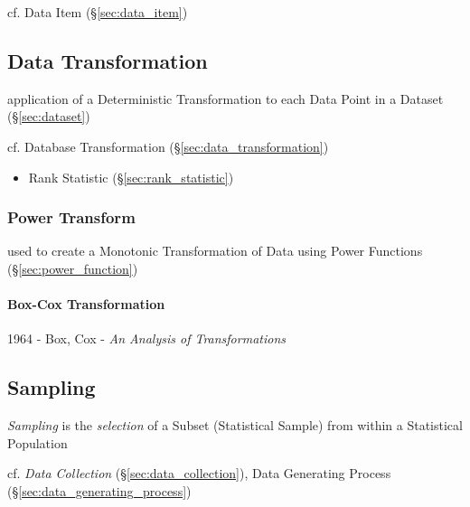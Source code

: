 cf. Data Item (\S\ref{sec:data_item})



\subsection{Data Transformation}\label{sec:dataset_transformation}

application of a Deterministic Transformation to each Data Point in a Dataset
(\S\ref{sec:dataset})

\fist cf. Database Transformation (\S\ref{sec:data_transformation})

\begin{itemize}
  \item Rank Statistic (\S\ref{sec:rank_statistic})
\end{itemize}



\subsubsection{Power Transform}\label{sec:power_transform}

used to create a Monotonic Transformation of Data using Power Functions
(\S\ref{sec:power_function})



\paragraph{Box-Cox Transformation}\label{sec:boxcox_transformation}\hfill

1964 - Box, Cox - \emph{An Analysis of Transformations}



\subsection{Sampling}\label{sec:sampling}

\emph{Sampling} is the \emph{selection} of a Subset (Statistical Sample) from
within a Statistical Population

\fist cf. \emph{Data Collection} (\S\ref{sec:data_collection}), Data Generating
Process (\S\ref{sec:data_generating_process})

